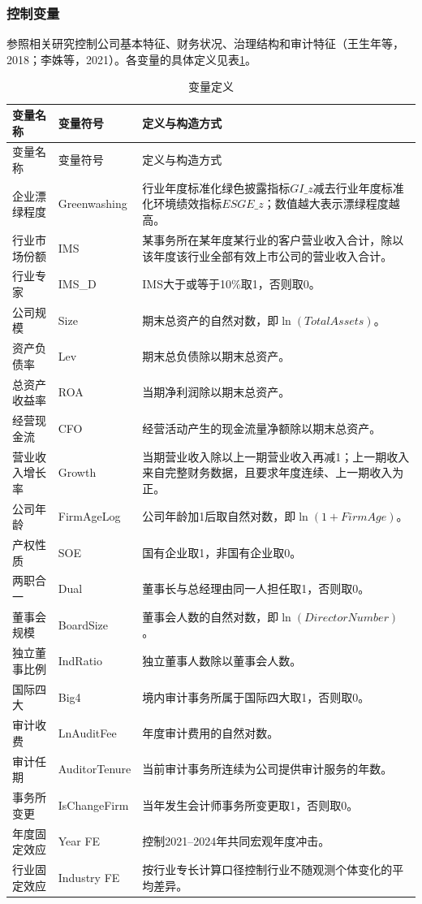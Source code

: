 \documentclass[UTF8,12pt,a4paper]{ctexart}
\begin{document}
\subsubsection{控制变量}

参照相关研究控制公司基本特征、财务状况、治理结构和审计特征（王生年等，2018；李姝等，2021）。各变量的具体定义见表\ref{tab:variables}。

\begin{longtable}{p{2.7cm}p{2.4cm}p{8.4cm}}
\caption{变量定义}\label{tab:variables}\\
\toprule
变量名称 & 变量符号 & 定义与构造方式\\
\midrule
\endfirsthead
\toprule
变量名称 & 变量符号 & 定义与构造方式\\
\midrule
\endhead
企业漂绿程度 & Greenwashing & 行业年度标准化绿色披露指标$GI\_z$减去行业年度标准化环境绩效指标$ESGE\_z$；数值越大表示漂绿程度越高。\\
行业市场份额 & IMS & 某事务所在某年度某行业的客户营业收入合计，除以该年度该行业全部有效上市公司的营业收入合计。\\
行业专家 & IMS\_D & IMS大于或等于10\%取1，否则取0。\\
公司规模 & Size & 期末总资产的自然对数，即$\ln(TotalAssets)$。\\
资产负债率 & Lev & 期末总负债除以期末总资产。\\
总资产收益率 & ROA & 当期净利润除以期末总资产。\\
经营现金流 & CFO & 经营活动产生的现金流量净额除以期末总资产。\\
营业收入增长率 & Growth & 当期营业收入除以上一期营业收入再减1；上一期收入来自完整财务数据，且要求年度连续、上一期收入为正。\\
公司年龄 & FirmAgeLog & 公司年龄加1后取自然对数，即$\ln(1+FirmAge)$。\\
产权性质 & SOE & 国有企业取1，非国有企业取0。\\
两职合一 & Dual & 董事长与总经理由同一人担任取1，否则取0。\\
董事会规模 & BoardSize & 董事会人数的自然对数，即$\ln(DirectorNumber)$。\\
独立董事比例 & IndRatio & 独立董事人数除以董事会人数。\\
国际四大 & Big4 & 境内审计事务所属于国际四大取1，否则取0。\\
审计收费 & LnAuditFee & 年度审计费用的自然对数。\\
审计任期 & AuditorTenure & 当前审计事务所连续为公司提供审计服务的年数。\\
事务所变更 & IsChangeFirm & 当年发生会计师事务所变更取1，否则取0。\\
年度固定效应 & Year FE & 控制2021--2024年共同宏观年度冲击。\\
行业固定效应 & Industry FE & 按行业专长计算口径控制行业不随观测个体变化的平均差异。\\
\bottomrule
\end{longtable}
\end{document}
